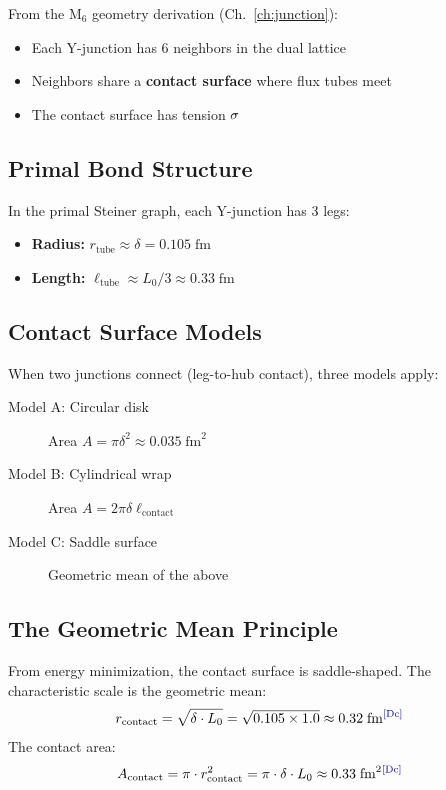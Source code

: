 From the M$_6$ geometry derivation (Ch.~\ref{ch:junction}):
\begin{itemize}
    \item Each Y-junction has 6 neighbors in the dual lattice
    \item Neighbors share a \textbf{contact surface} where flux tubes meet
    \item The contact surface has tension $\sigma$
\end{itemize}

\subsection{Primal Bond Structure}

In the primal Steiner graph, each Y-junction has 3 legs:
\begin{itemize}
    \item \textbf{Radius:} $r_{\text{tube}} \approx \delta = 0.105\;\text{fm}$
    \item \textbf{Length:} $\ell_{\text{tube}} \approx L_0/3 \approx 0.33\;\text{fm}$
\end{itemize}

\subsection{Contact Surface Models}

When two junctions connect (leg-to-hub contact), three models apply:

\begin{description}
    \item[Model A: Circular disk] Area $A = \pi\delta^2 \approx 0.035\;\text{fm}^2$
    \item[Model B: Cylindrical wrap] Area $A = 2\pi\delta \ell_{\text{contact}}$
    \item[Model C: Saddle surface] Geometric mean of the above
\end{description}

\subsection{The Geometric Mean Principle}

\begin{derivationbox}[title=Contact Area Derivation]
    From energy minimization, the contact surface is saddle-shaped. The
    characteristic scale is the geometric mean:
    \begin{equation}
        r_{\text{contact}} = \sqrt{\delta \cdot L_0} = \sqrt{0.105 \times 1.0} \approx 0.32\;\text{fm} \tagDc
    \end{equation}
    The contact area:
    \begin{equation}
        A_{\text{contact}} = \pi \cdot r_{\text{contact}}^2 = \pi \cdot \delta \cdot L_0 \approx 0.33\;\text{fm}^2 \tagDc
        \label{eq:contact_area}
    \end{equation}
\end{derivationbox}

